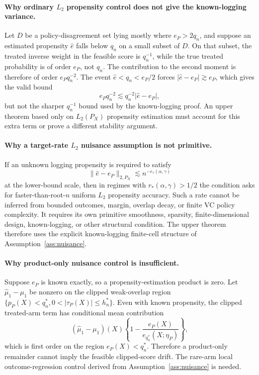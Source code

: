 \documentclass[11pt]{article}
\theoremstyle{definition}
\theoremstyle{plain}
\theoremstyle{remark}
\begin{document}
\paragraph{Why ordinary \(L_2\) propensity control does not give the known-logging variance.}
Let \(D\) be a policy-disagreement set lying mostly where \(e_P>2q_n\), and
suppose an estimated propensity \(\widehat e\) falls below \(q_n\) on a small
subset of \(D\).  On that subset, the treated inverse weight in the feasible
score is \(q_n^{-1}\), while the true treated probability is of order
\(e_P\), not \(q_n\).  The contribution to the second moment is therefore of
order \(e_P q_n^{-2}\).  The event \(\widehat e<q_n<e_P/2\) forces
\(|\widehat e-e_P|\gtrsim e_P\), which gives the valid bound
\[
e_P q_n^{-2}\lesssim q_n^{-2}|\widehat e-e_P|,
\]
but not the sharper \(q_n^{-1}\) bound used by the known-logging proof.
An upper theorem based only on \(L_2(P_X)\) propensity estimation must account
for this extra term or prove a different stability argument.

\paragraph{Why a target-rate \(L_2\) nuisance assumption is not primitive.}
If an unknown logging propensity is required to satisfy
\[
\|\widehat e-e_P\|_{2,P_X}\lesssim n^{-r_*(\alpha,\gamma)}
\]
at the lower-bound scale, then in regimes with
\(r_*(\alpha,\gamma)>1/2\) the condition asks for faster-than-root-\(n\)
uniform \(L_2\) propensity accuracy.  Such a rate cannot be inferred from
bounded outcomes, margin, overlap decay, or finite VC policy complexity.  It
requires its own primitive smoothness, sparsity, finite-dimensional design,
known-logging, or other structural condition.  The upper theorem therefore
uses the explicit known-logging finite-cell structure of
Assumption~\ref{ass:nuisance}.

\paragraph{Why product-only nuisance control is insufficient.}
Suppose \(e_P\) is known exactly, so a propensity-estimation product is zero.
Let \(\widehat\mu_1-\mu_1\) be nonzero on the clipped weak-overlap region
\(\{p_P(X)<q_n^*,0<|\tau_P(X)|\le h_n^*\}\).  Even with known propensity, the
clipped treated-arm term has conditional mean contribution
\[
(\widehat\mu_1-\mu_1)(X)
\left\{1-\frac{e_P(X)}{e_{q_n^*}(X;\eta_P)}\right\},
\]
which is first order on the region \(e_P(X)<q_n^*\).  Therefore a
product-only remainder cannot imply the feasible clipped-score drift.  The
rare-arm local outcome-regression control derived from
Assumption~\ref{ass:nuisance} is needed.
\end{document}
